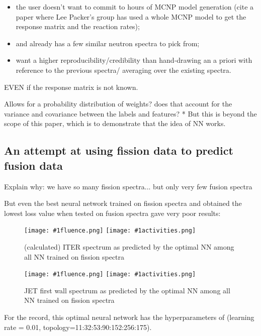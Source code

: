 \documentclass[a4paper, 12pt]{article}
\newcommand{\fluenceandactivities}[1]{
\texttt{[image: \#1fluence.png]}
\texttt{[image: \#1activities.png]}
}
\begin{document}
\begin{itemize}
    \item the user doesn't want to commit to hours of MCNP model generation (cite a paper where Lee Packer's group has used a whole MCNP model to get the response matrix and the reaction rates);
    \item and already has a few similar neutron spectra to pick from;
    \item want a higher reproducibility/credibility than hand-drawing an a priori with reference to the previous spectra/ averaging over the existing spectra.
\end{itemize}

EVEN if the response matrix is not known.

Allows for a probability distribution of weights? does that account for the variance and covariance between the labels and features? *
But this is beyond the scope of this paper, which is to demonstrate that the idea of NN works.

\subsection{An attempt at using fission data to predict fusion data}
Explain why: we have so many fission spectra... but only very few fusion spectra

But even the best neural network trained on fission spectra and obtained the lowest loss value when tested on fusion spectra gave very poor results:
\begin{figure}
\centering
\fluenceandactivities{/home/ocean/Documents/GitHubDir/unfolding/unfolding/unfoldingsuite/neuralnetwork/realoutputEarlyStopping/SelectedNNreplicated/fission-fusion/0918_0325_5_layer_test_mse_1_test_007_}
\caption{(calculated) ITER spectrum as predicted by the optimal NN among all NN trained on fission spectra} \label{fission-fusionBad}
\end{figure}

\begin{figure}
\centering
\fluenceandactivities{/home/ocean/Documents/GitHubDir/unfolding/unfolding/unfoldingsuite/neuralnetwork/realoutputEarlyStopping/SelectedNNreplicated/fission-fusion/0918_0325_5_layer_test_mse_1_test_016_}
\caption{JET first wall spectrum as predicted by the optimal NN among all NN trained on fission spectra}\label{fission-fusionGood}
\end{figure}

For the record, this optimal neural network has the hyperparameters of (learning rate = 0.01, topology=11:32:53:90:152:256:175).
\end{document}
